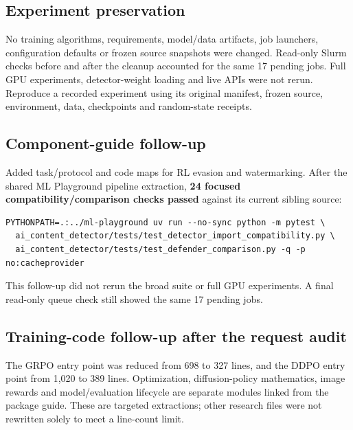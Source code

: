 \subsection{Experiment
preservation}\label{record-docs-cleanup-validation-md-experiment-preservation}

No training algorithms, requirements, model/data artifacts, job
launchers, configuration defaults or frozen source snapshots were
changed. Read-only Slurm checks before and after the cleanup accounted
for the same 17 pending jobs. Full GPU experiments, detector-weight
loading and live APIs were not rerun. Reproduce a recorded experiment
using its original manifest, frozen source, environment, data,
checkpoints and random-state receipts.

\subsection{Component-guide
follow-up}\label{record-docs-cleanup-validation-md-component-guide-follow-up}

Added task/protocol and code maps for RL evasion and watermarking. After
the shared ML Playground pipeline extraction, \textbf{24 focused
compatibility/comparison checks passed} against its current sibling
source:

\begin{Verbatim}
PYTHONPATH=.:../ml-playground uv run --no-sync python -m pytest \
  ai_content_detector/tests/test_detector_import_compatibility.py \
  ai_content_detector/tests/test_defender_comparison.py -q -p no:cacheprovider
\end{Verbatim}

This follow-up did not rerun the broad suite or full GPU experiments. A
final read-only queue check still showed the same 17 pending jobs.

\subsection{Training-code follow-up after the request
audit}\label{record-docs-cleanup-validation-md-training-code-follow-up-after-the-request-audit}

The GRPO entry point was reduced from 698 to 327 lines, and the DDPO
entry point from 1,020 to 389 lines. Optimization, diffusion-policy
mathematics, image rewards and model/evaluation lifecycle are separate
modules linked from the package guide. These are targeted extractions;
other research files were not rewritten solely to meet a line-count
limit.

